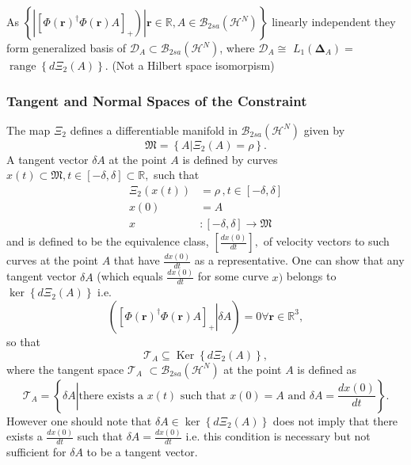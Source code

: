 \documentclass[aps,preprint]{revtex4}%
\begin{document}
As $\left\{  \left.  \left\vert \left[  \Phi\left(  \boldsymbol{r}\right)
^{\dagger}\Phi\left(  \boldsymbol{r}\right)  A\right]  _{+}\right)
\right\vert \mathbf{r\in}\mathbb{R},A\in\mathcal{B}_{2sa}\left(
\mathcal{H}^{N}\right)  \right\}  $ linearly independent they form generalized
basis of $\mathcal{D}_{A}\subset\mathcal{B}_{2sa}\left(  \mathcal{H}%
^{N}\right)  $, where $\mathcal{D}_{A}\cong$ $L_{1}\left(  \boldsymbol{\Delta
}_{A}\right)  =$ $\operatorname{range}\left\{  d\Xi_{2}\left(  A\right)
\right\}  .$ (Not a Hilbert space isomorpism)

\subsubsection{Tangent and Normal Spaces of the Constraint}

The map $\Xi_{2}$ defines a differentiable manifold in $\mathcal{B}%
_{2sa}\left(  \mathcal{H}^{N}\right)  $ given by
\begin{equation}
\mathfrak{M}=\left\{  \left.  A\right\vert \Xi_{2}\left(  A\right)
=\rho\right\}  .
\end{equation}
A tangent vector $\delta A$ at the point $A$ is defined by curves $x\left(
t\right)  \subset\mathfrak{M,}t\in\left[  -\delta,\delta\right]
\subset\mathbb{R},$ such that
\begin{align*}
\Xi_{2}\left(  x\left(  t\right)  \right)   &  =\rho\,,t\in\left[
-\delta,\delta\right] \\
x\left(  0\right)   &  =A\\
x  &  :\left[  -\delta,\delta\right]  \longrightarrow\mathfrak{M}%
\end{align*}
and is defined to be the equivalence class, $\left[  \frac{dx\left(  0\right)
}{dt}\right]  ,$ of velocity vectors to such curves at the point $A$ that have
$\frac{dx\left(  0\right)  }{dt}$ as a representative. One can show that any
tangent vector $\delta A$ (which equals $\frac{dx\left(  0\right)  }{dt}$ for
some curve $x)$ belongs to $\ker\left\{  d\Xi_{2}\left(  A\right)  \right\}  $
i.e.%
\begin{equation}
\left(  \left.  \left[  \Phi\left(  \boldsymbol{r}\right)  ^{\dagger}%
\Phi\left(  \boldsymbol{r}\right)  A\right]  _{+}\right\vert \delta A\right)
=0\forall\boldsymbol{r\in}\mathbb{R}^{3},
\end{equation}
so that
\begin{equation}
\mathcal{T}_{A}\subseteq\operatorname{Ker}\left\{  d\Xi_{2}\left(  A\right)
\right\}  ,
\end{equation}
where the tangent space $\mathcal{T}_{A}$ $\subset\mathcal{B}_{2sa}\left(
\mathcal{H}^{N}\right)  $ at the point $A$ is defined as
\begin{equation}
\mathcal{T}_{A}=\left\{  \delta A\left\vert \text{there exists a }x\left(
t\right)  \text{ such that }x\left(  0\right)  =A\text{ and }\delta
A=\frac{dx\left(  0\right)  }{dt}\right.  \right\}  .
\end{equation}
However one should note that $\delta A\in\ker\left\{  d\Xi_{2}\left(
A\right)  \right\}  $ does not imply that there exists a $\frac{dx\left(
0\right)  }{dt}$ such that $\delta A=\frac{dx\left(  0\right)  }{dt}$ i.e.
this condition is necessary but not sufficient for $\delta A$ to be a tangent vector.
\end{document}
